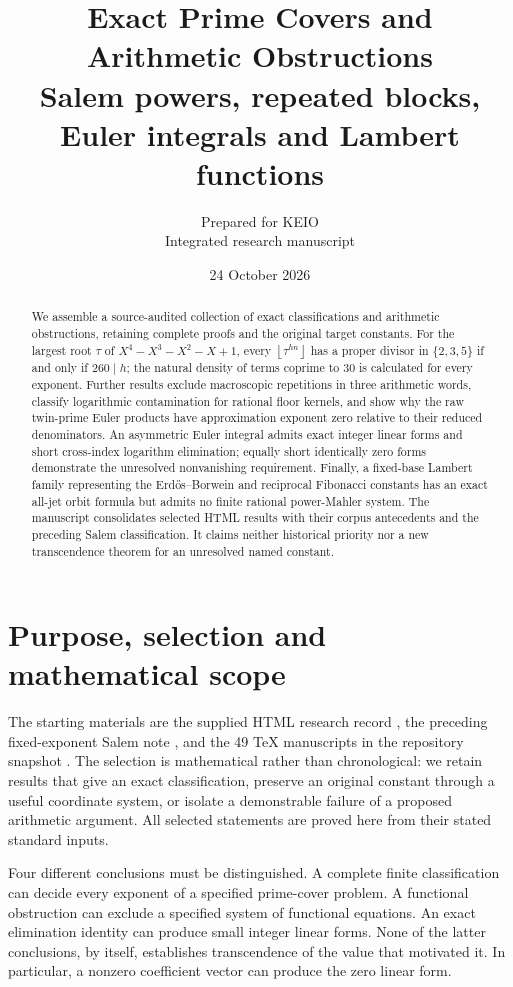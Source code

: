 \documentclass[11pt,a4paper]{article}
\title{\bfseries Exact Prime Covers and Arithmetic Obstructions\\[7pt]
\large Salem powers, repeated blocks, Euler integrals and Lambert functions}
\author{Prepared for KEIO\\[2pt]\small Integrated research manuscript}
\date{24 October 2026}
\theoremstyle{definition}\newtheorem{definition}[theorem]{Definition}
\theoremstyle{remark}\newtheorem{remark}[theorem]{Remark}
\newcommand{\floor}[1]{\left\lfloor#1\right\rfloor}
\begin{document}
\maketitle
\begin{abstract}
We assemble a source-audited collection of exact classifications and
arithmetic obstructions, retaining complete proofs and the original
target constants. For the largest root $\tau$ of
$X^4-X^3-X^2-X+1$, every $\floor{\tau^{hn}}$ has a proper divisor in
$\{2,3,5\}$ if and only if $260\mid h$; the natural density of terms
coprime to $30$ is calculated for every exponent. Further results
exclude macroscopic repetitions in three arithmetic words,
classify logarithmic contamination for rational floor kernels, and
show why the raw twin-prime Euler products have approximation exponent
zero relative to their reduced denominators. An asymmetric Euler
integral admits exact integer linear forms and short cross-index
logarithm elimination; equally short identically zero forms demonstrate
the unresolved nonvanishing requirement. Finally, a fixed-base Lambert
family representing the Erd\H{o}s--Borwein and reciprocal Fibonacci
constants has an exact all-jet orbit formula but admits no finite
rational power-Mahler system. The manuscript consolidates selected
HTML results with their corpus antecedents and the preceding Salem
classification. It claims neither historical priority nor a new
transcendence theorem for an unresolved named constant.
\end{abstract}
\tableofcontents
\newpage
\section{Purpose, selection and mathematical scope}\label{sec:introduction}
The starting materials are the supplied HTML research record
\cite{HTMLRecord}, the preceding fixed-exponent Salem note
\cite{SalemNote}, and the 49 TeX manuscripts in the repository snapshot
\cite{Corpus}. The selection is mathematical rather than chronological:
we retain results that give an exact classification, preserve an original
constant through a useful coordinate system, or isolate a demonstrable
failure of a proposed arithmetic argument. All selected statements are
proved here from their stated standard inputs.

Four different conclusions must be distinguished. A complete finite
classification can decide every exponent of a specified prime-cover
problem. A functional obstruction can exclude a specified system of
functional equations. An exact elimination identity can produce small
integer linear forms. None of the latter conclusions, by itself,
establishes transcendence of the value that motivated it. In particular,
a nonzero coefficient vector can produce the zero linear form.
\end{document}
